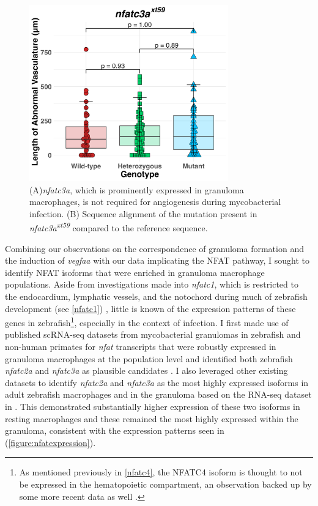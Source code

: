 \begin{figure}
\centering
\includegraphics[height=3in]{images/JB236_nfatc3a_103022.png}
\caption[\textit{nfatc3a} is dispensable for angiogenesis]{(A)\textit{nfatc3a}, which is prominently expressed in granuloma macrophages, is not required for angiogenesis during mycobacterial infection. (B) Sequence alignment of the mutation present in \textit{nfatc3a\textsuperscript{xt59}} compared to the reference sequence.}
\label{figure:nfatc3a}
\end{figure}

Combining our observations on the correspondence of granuloma formation and the induction of \textit{vegfaa} with our data implicating the NFAT pathway, I sought to identify NFAT isoforms that were enriched in granuloma macrophage populations. Aside from investigations made into \textit{nfatc1}, which is restricted to the endocardium, lymphatic vessels, and the notochord during much of zebrafish development (see \autoref{nfatc1}) \citep{Pestel2016, Shin2019, Bagwell2020}, little is known of the expression patterns of these genes in zebrafish\footnote{As mentioned previously in \autoref{nfatc4}, the NFATC4 isoform is thought to not be expressed in the hematopoietic compartment, an observation backed up by some more recent data as well \citep{Peuker2022}.}, especially in the context of infection. I first made use of published scRNA\hyp{}seq datasets from mycobacterial granulomas in zebrafish and non\hyp{}human primates for \textit{nfat} transcripts that were robustly expressed in granuloma macrophages at the population level and identified both zebrafish \textit{nfatc2a} and \textit{nfatc3a} as plausible candidates \citep{Cronan2021, Gideon2022}. I also leveraged other existing datasets to identify \textit{nfatc2a} and \textit{nfatc3a} as the most highly expressed isoforms in adult zebrafish macrophages and in the granuloma based on the RNA\hyp{}seq dataset in \citet{Cronan2016}. This demonstrated substantially higher expression of these two isoforms in resting macrophages and these remained the most highly expressed within the granuloma, consistent with the expression patterns seen in \citet{Cronan2021} (\autoref{figure:nfatexpression}).

